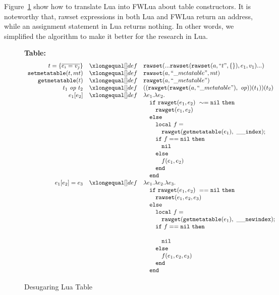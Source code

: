 Figure~\ref{fig:desLuaTable} show how to translate Lua into FWLua about table constructors. It is noteworthy that, rawset expressions in both Lua and FWLua return an address, while an assignment statement in Lua returns nothing. In other words, we simplified the algorithm to make it better for the research in Lua.

\begin{figure}
\caption{Desugaring Lua Table}\label{fig:desLuaTable}
{\bf Table:}\[
\begin{array}{rclcl}
\desugar{t = \{\overline{e_i = v_j}\}}{{\tt rawset}(...{\tt rawset}({\tt rawset}(a,``t", \{\}), e_1, v_1)...)}
\desugar{{\tt setmetatable}(t, mt)}{{\tt rawset}(a,``\_metatable", mt)}
\desugar{{\tt getmetatable}(t)}{{\tt rawget}(a,``\_metatable")}
\desugar{t_1~{\it op}~t_2}{(({\tt rawget}({\tt rawget}(a,``\_metatable"),~{\it op}))(t_1))(t_2)}
\desugar{e_1[e_2]}{\lambda e_1.\lambda e_2.}
\desugarline{ 
     \quad{\tt if}~ {\tt rawget}(e_1, e_2) ~\sim= {\tt nil} ~ {\tt then}\\
     \quad\quad{\tt rawget}(e_1, e_2) ~\\
     \quad{\tt else}\\
     \quad\quad{\tt local}~f = \\
     \quad\quad\quad {\tt rawget}({\tt getmetatable}(e_1),~{\tt{\_}{\_}index});\\
     \quad\quad{\tt if}~ f == {\tt nil} ~ {\tt then}\\
     \quad\quad\quad {\tt nil} \\
     \quad\quad{\tt else}\\
     \quad\quad\quad f(e_1,e_2)\\ 
     \quad\quad{\tt end}\\
     \quad{\tt end}\\
     }
\desugar{e_1[e_2]=e_3}{
    \lambda e_1.\lambda e_2.\lambda e_3.
}
\desugarline{  
     \quad{\tt if}~  {\tt rawget}(e_1, e_2) ~== {\tt nil} ~ {\tt then}\\
     \quad\quad{\tt rawset}(e_1, e_2,e_3) ~\\
     \quad{\tt else}\\
     \quad\quad{\tt local}~f = \\
     \quad\quad\quad{\tt rawget}({\tt getmetatable}(e_1),~{\tt{\_}{\_}newindex});\\
     \quad\quad{\tt if}~ f == {\tt nil} ~ {\tt then}\\\\
     \quad\quad\quad {\tt nil} \\
     \quad\quad{\tt else}\\
     \quad\quad\quad f(e_1,e_2,e_3)\\ 
     \quad\quad{\tt end}\\
     \quad{\tt end}\\
}
\end{array}\]
\end{figure}

